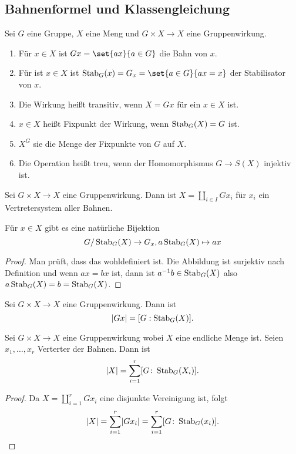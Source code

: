 \subsection{Bahnenformel und Klassengleichung}
\begin{Def}
    Sei $G$ eine Gruppe, $X$ eine Meng und $G\times X\to X$ eine Gruppenwirkung.
    \begin{enumerate}
        \item Für $x\in X$ ist $Gx=\set{ax}{a\in G}$ die Bahn von $x$.
        \item Für ist $x\in X$ ist $\Stab_G(x)=G_x=\set{a\in G}{ax=x}$ der Stabilisator von $x$.
        \item Die Wirkung heißt transitiv, wenn $X=Gx$ für ein $x\in X$ ist.
        \item $x\in X$ heißt Fixpunkt der Wirkung, wenn $\operatorname{Stab}_G(X)=G$ ist.
        \item $X^G$ sie die Menge der Fixpunkte von $G$ auf $X$.
        \item Die Operation heißt treu, wenn der Homomorphismus $G\to S(X)$ injektiv ist.
    \end{enumerate}
\end{Def}
\begin{Bem}
    Sei $G\times X\to X$ eine Gruppenwirkung. Dann ist $X=\coprod _{i\in I}Gx_i$ für $x_i$ ein Vertretersystem aller Bahnen.
\end{Bem}
\begin{Lemma}\label{Lem:Bahnengleichung1}
    Für $x\in X$ gibt es eine natürliche Bijektion 
    $$G/\operatorname{Stab}_G(X)\to G_x, a\operatorname{Stab}_G(X)\mapsto ax$$
\end{Lemma}
\begin{proof}
    Man prüft, dass das wohldefiniert ist. Die Abbildung ist surjektiv nach Definition und wenn $ax=bx$ ist, dann ist $a^{-1}b\in\operatorname{Stab}_G(X)$ also $a\operatorname{Stab}_G(X)=b=\operatorname{Stab}_G(X)$.
\end{proof}
\begin{Kor}
    Sei $G\times X\to X$ eine Gruppenwirkung. Dann ist 
    $$\lvert Gx\rvert=[G:\operatorname{Stab}_G(X)].$$
\end{Kor}
\begin{Satz}[Bahnengleichung]\label{Satz:Bahnengleichung}
    Sei $G\times X\to X$ eine Gruppenwirkung wobei $X$ eine endliche Menge ist. Seien $x_1,\dots,x_r$ Verterter der Bahnen. Dann ist 
    $$\lvert X\rvert=\sum_{i=1}^r[G\colon\operatorname{Stab}_G(X_i)].$$
\end{Satz}
\begin{proof}
    Da $X=\coprod_{i=1}^rGx_i$ eine disjunkte Vereinigung ist, folgt 
    $$\lvert X\rvert=\sum_{i=1}^r\lvert Gx_i\rvert=\sum_{i=1}^r[G\colon\operatorname{Stab}_G(x_i)].$$
\end{proof}
